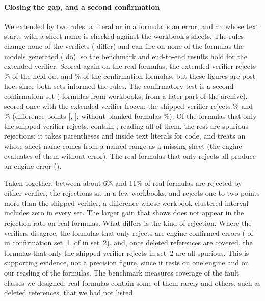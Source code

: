 \ifdefined\rwcGFormulas
\paragraph{Closing the gap, and a second confirmation}
We extended \gc{} by two rules: a literal  or  in a formula is an error, and an  whose text starts with a sheet name is checked against the workbook's sheets. The rules change none of the \eqInstances{} \sheetfault{} verdicts (\eqDiff{} differ) and can fire on none of the \eqFormulas{} formulas the models generated (\eqHits{} do), so the benchmark and end-to-end results hold for the extended verifier. Scored again on the real formulas, the extended verifier rejects \rwcTPVtwoReject\% of the held-out and \rwcFPVtwoReject\% of the confirmation formulas, but these figures are post hoc, since both sets informed the rules. The confirmatory test is a second confirmation set (\rwcGFormulas{} formulas from \rwcGWorkbooks{} workbooks, from a later part of the archive), scored once with the extended verifier frozen: the shipped verifier rejects \rwcGVoneReject\% and \gc{} \rwcGVtwoReject\% (difference \rwcGDiff{} points [\rwcGDiffLo, \rwcGDiffHi]; without blanked formulas \rwcGVtwoRejectNoEmpty\%). Of the \rwcGOOnlyVone{} formulas that only the shipped verifier rejects, \rwcGOOnlyVoneRefLiteral{} contain ; reading all of them, the rest are spurious rejections: it takes parentheses and \code{!} inside text literals for code, and treats an  whose sheet name comes from a named range as a missing sheet (the engine evaluates \rwcGOOnlyVoneEngineOk{} of them without error). The \rwcGOOnlyVtwoReal{} real formulas that only \gc{} rejects all produce an engine error (\rwcGOOnlyVtwoEngineError{}).
\fi

Taken together, between about 6\% and 11\% of real formulas are rejected by either verifier, the rejections sit in a few workbooks, and \gc{} rejects one to two points more than the shipped verifier, a difference whose workbook-clustered interval includes zero in every set. The larger gain that \sheetfault{} shows does not appear in the rejection rate on real formulas. What differs is the kind of rejection. Where the verifiers disagree, the formulas that only \gc{} rejects are engine-confirmed errors (\rwcFOOnlyVtwoEngineError{} of \rwcFOOnlyVtwoReal{} in confirmation set~1\ifdefined\rwcGFormulas, \rwcGOOnlyVtwoEngineError{} of \rwcGOOnlyVtwoReal{} in set~2\fi)\ifdefined\rwcGFormulas, and, once deleted references are covered, the \rwcGOOnlyVone{} formulas that only the shipped verifier rejects in set~2 are all spurious\fi. This is supporting evidence, not a precision figure, since it rests on one engine and on our reading of the formulas. The benchmark measures coverage of the fault classes we designed; real formulas contain some of them rarely and others, such as deleted references, that we had not listed.

